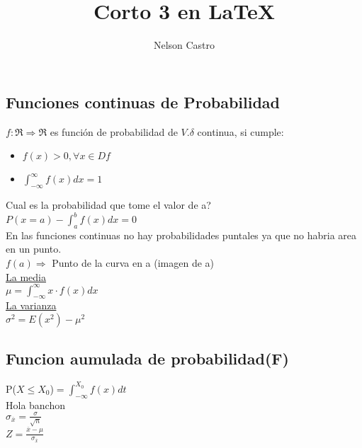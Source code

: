 \documentclass[12pt]{report}
\title{Corto 3 en \LaTeX}
\author{Nelson Castro}
\begin{document}
        \maketitle
        \newpage
        \subsection{Funciones continuas de Probabilidad}
        $f:\Re \Rightarrow \Re$ es función de probabilidad de $V.\delta$ continua, si cumple:
        \begin{itemize}
           \item  
           $f(x)>0,\forall x\in Df$
           \item
           $\int_{-\infty}^{\infty} f(x)dx=1$
        \end{itemize}
        Cual es la probabilidad que tome el valor de a?
        \\ $P(x=a)-\int_{a}^{b}f(x)dx=0$        
        \\ En las funciones continuas no hay probabilidades puntales ya que no habria area en un punto.
        \\ $f(a)\Rightarrow$ Punto de la curva en a (imagen de a)
        \\ \underline{La media}
        \\$\mu = \int_{-\infty}^{\infty}x\cdot f(x) dx$
        \\ \underline{La varianza}
        \\$\sigma^2=E(x^2)-\mu^2$
        \subsection{Funcion aumulada de probabilidad(F)}
        P($X\leq X_0$)$=\int_{-\infty}^{X_0}f(x)dt$
            \\Hola banchon
         \\$\sigma _{\overline{x}}=\frac{\sigma}{\sqrt{n}}$
         \\$Z=\frac{\overline{x}-\mu}{\sigma _{\overline{x}}}$
    
\end{document}

